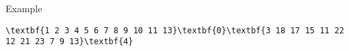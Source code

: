 Example
\begin{verbatim}
\textbf{1 2 3 4 5 6 7 8 9 10 11 13}\textbf{0}\textbf{3 18 17 15 11 22 12 21 23 7 9 13}\textbf{4}\end{verbatim}